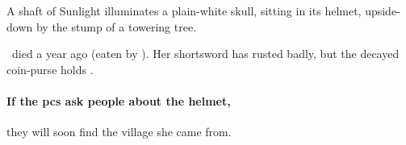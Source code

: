 \begin{boxtext}
  A shaft of Sunlight illuminates a plain-white skull, sitting in its helmet, upside-down by the stump of a towering tree.
\end{boxtext}

\composeHumanName\ died a year ago (eaten by ).
Her shortsword has rusted badly, but the decayed coin-purse holds \lootMedium.

\paragraph{If the \glspl{pc} ask people about the helmet,}
they will soon find the \gls{village} she came from.
